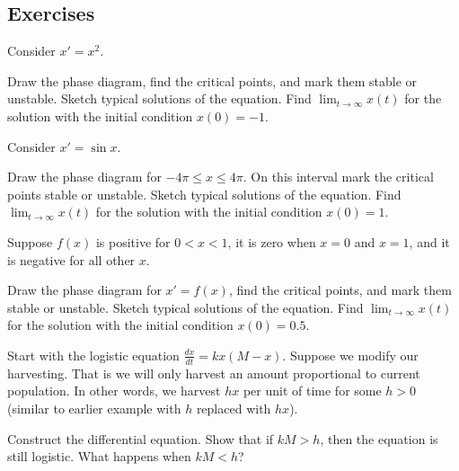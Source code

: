 \subsection{Exercises}

\begin{samepage}
\begin{exercise}
Consider $x' = x^2$.
\begin{tasks}
\task Draw the phase diagram,
find the critical points, and mark them stable or unstable.
\task Sketch typical solutions of the equation.
\task Find $\displaystyle \lim_{t\to \infty} x(t)$ for the solution with the initial condition
$x(0) = -1$.
\end{tasks}
\end{exercise}
\end{samepage}

\begin{exercise}
Consider $x' = \sin x$.
\begin{tasks}
\task Draw the phase diagram for $-4\pi \leq x \leq 4\pi$.  On this interval
mark the critical points stable or unstable.
\task Sketch typical solutions of the equation.
\task Find $\displaystyle \lim_{t\to \infty} x(t)$ for the solution with the initial condition
$x(0) = 1$.
\end{tasks}
\end{exercise}

\begin{exercise}
Suppose $f(x)$ is positive for $0 < x < 1$, it is zero when $x=0$ and $x=1$,
and it is negative for all other $x$.
\begin{tasks}
\task Draw the phase diagram for $x' = f(x)$,
find the critical points, and mark them stable or unstable.
\task Sketch typical solutions of the equation.
\task Find $\displaystyle \lim_{t\to \infty} x(t)$ for the solution with the initial condition
$x(0) = 0.5$.
\end{tasks}
\end{exercise}

\begin{exercise}
Start with the logistic equation
$\frac{dx}{dt} = kx(M-x)$.
Suppose we modify our harvesting.  That is we will only harvest 
an amount proportional to current population.  In other words, we harvest $hx$
per unit of time
for some $h > 0$ (similar to earlier example with $h$ replaced with $hx$).
\begin{tasks}
\task Construct the differential equation. 
\task Show that if $kM > h$, then
the equation is still logistic.
\task What happens when $kM < h$?
\end{tasks}
\end{exercise}

